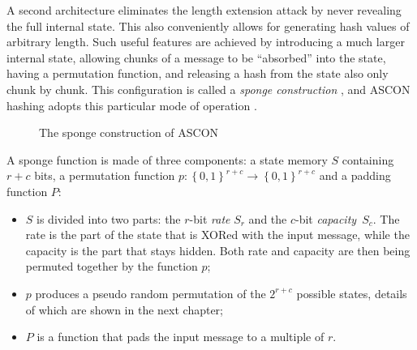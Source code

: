 A second architecture eliminates the length extension attack by never revealing the full internal state. This also conveniently allows for generating hash values of arbitrary length. Such useful features are achieved by introducing a much larger internal state, allowing chunks of a message to be ``absorbed'' into the state, having a permutation function, and releasing a hash from the state also only chunk by chunk. This configuration is called a \textit{sponge construction} \cite{guido_b_d_michaël_p_2011}, and ASCON hashing adopts this particular mode of operation \cite{ascon_specification}.

\begin{figure}[H]
    \centering
  \caption{The sponge construction of ASCON}
\end{figure}
A sponge function is made of three components: a state memory $S$ containing ${r+c}$ bits, a permutation function $p: \left\{0,1\right\}^{r+c} \rightarrow \left\{0,1\right\}^{r+c}$ and a padding function $P$:

\begin{itemize}
  \item $S$ is divided into two parts: the $r$-bit \textit{rate} $S_r$ and the $c$-bit \textit{capacity}~$S_c$. The rate is the part of the state that is XORed with the input message, while the capacity is the part that stays hidden. Both rate and capacity are then being permuted together by the function $p$;
  \item $p$ produces a pseudo random permutation of the $2^{r+c}$ possible states, details of which are shown in the next chapter;
  \item $P$ is a function that pads the input message to a multiple of $r$.
\end{itemize}

